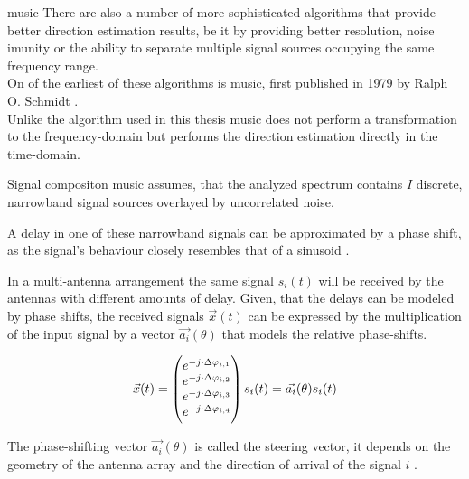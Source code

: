 \begin{subchapter}{\acrshort{music}}
  There are also a number of more sophisticated algorithms
  that provide better direction estimation results, be it
  by providing better resolution, noise imunity or the
  ability to separate multiple signal sources occupying
  the same frequency range. \\

  On of the earliest of these algorithms is \gls{music},
  first published in 1979 by Ralph O. Schmidt \cite{schmidt1979}. \\

  Unlike the algorithm used in this thesis \gls{music}
  does not perform a transformation to the frequency-domain
  but performs the direction estimation directly
  in the time-domain. \\

  \begin{subsubchapter}{Signal compositon}
    \gls{music} assumes, that the analyzed spectrum contains
    $I$ discrete, narrowband signal sources overlayed by
    uncorrelated noise.

    A delay in one of these narrowband signals can be approximated
    by a phase shift, as the signal's behaviour closely resembles
    that of a sinusoid \cite[p. 4]{girdmusic}.

    In a multi-antenna arrangement the same signal $s_{i}(t)$ will be
    received by the antennas with different amounts of delay.
    Given, that the delays can be modeled by phase shifts,
    the received signals $\vec{x}(t)$ can be expressed by the multiplication
    of the input signal by a vector $\vec{a_{i}}(\theta)$ that models the
    relative phase-shifts.

    \begin{equation}
      \vec{x}(t) =
        \begin{pmatrix}
          e^{-j \cdot \Delta\varphi_{i,1}} \\
          e^{-j \cdot \Delta\varphi_{i,2}} \\
          e^{-j \cdot \Delta\varphi_{i,3}} \\
          e^{-j \cdot \Delta\varphi_{i,4}}
        \end{pmatrix} s_{i}(t) = \\
      \vec{a_{i}}(\theta) s_{i}(t)
    \end{equation}

    The phase-shifting vector $\vec{a_{i}}(\theta)$ is called the
    steering vector, it depends on the geometry of the antenna array
    and the direction of arrival of the signal $i$ \cite{chengokeda2010}. \\


\end{subsubchapter}
\end{subchapter}
